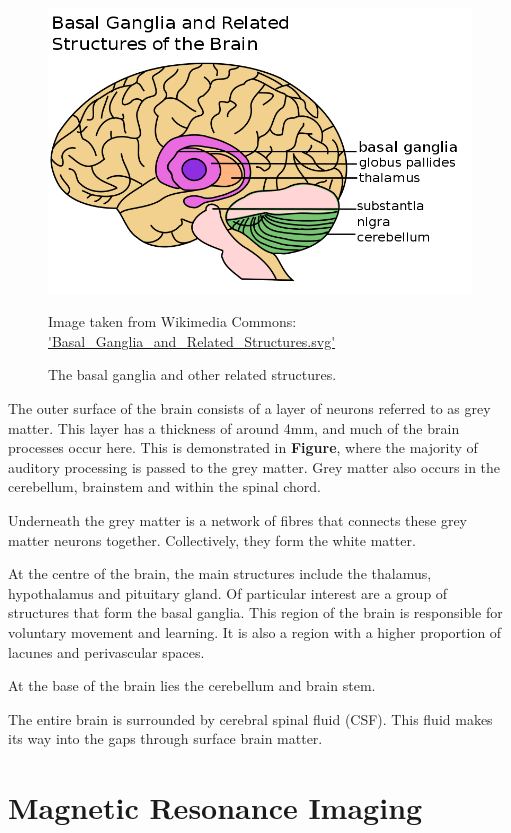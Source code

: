 \documentclass[honours,12pt]{unswthesis}
\numberwithin{equation}{section}
\begin{document}
\begin{figure}[h]
	\centering
	\includegraphics[width=\textwidth]{Images/2_Basal_Ganglia_and_Related_Structures.png}
	\caption{The basal ganglia and other related structures.}
	\small Image taken from Wikimedia Commons: \url{'Basal_Ganglia_and_Related_Structures.svg'}
\end{figure}


The outer surface of the brain consists of a layer of neurons referred to as grey matter. This layer has a thickness of around 4mm, and much of the brain processes occur here. This is demonstrated in \textbf{Figure}, where the majority of auditory processing is passed to the grey matter. Grey matter also occurs in the cerebellum, brainstem and within the spinal chord.

Underneath the grey matter is a network of fibres that connects these grey matter neurons together. Collectively, they form the white matter. 



At the centre of the brain, the main structures include the thalamus, hypothalamus and pituitary gland. Of particular interest are a group of structures that form the basal ganglia. This region of the brain is responsible for voluntary movement and learning. It is also a region with a higher proportion of lacunes and perivascular spaces.

At the base of the brain lies the cerebellum and brain stem. 

The entire brain is surrounded by cerebral spinal fluid (CSF). This fluid makes its way into the gaps through surface brain matter.


\section{Magnetic Resonance Imaging}\label{MRI}
\end{document}
